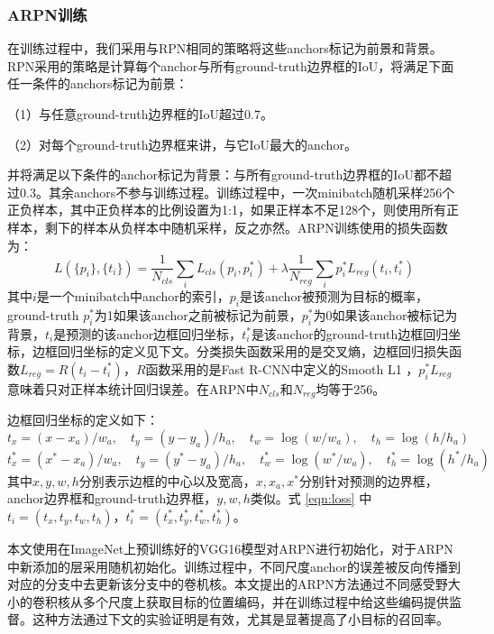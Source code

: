 \subsubsection{ARPN训练}
在训练过程中，我们采用与RPN相同的策略将这些anchors标记为前景和背景。RPN采用的策略是计算每个anchor与所有ground-truth边界框的IoU，将满足下面任一条件的anchors标记为前景：
\begin{namelist}{}
	\item （1）与任意ground-truth边界框的IoU超过0.7。
	\item （2）对每个ground-truth边界框来讲，与它IoU最大的anchor。
\end{namelist}
并将满足以下条件的anchor标记为背景：与所有ground-truth边界框的IoU都不超过0.3。其余anchors不参与训练过程。训练过程中，一次minibatch随机采样256个正负样本，其中正负样本的比例设置为1:1，如果正样本不足128个，则使用所有正样本，剩下的样本从负样本中随机采样，反之亦然。ARPN训练使用的损失函数为：
\begin{equation}\label{eqn:loss}
L(\{p_i\},\{t_i\})=\frac{1}{N_{cls}}\sum_{i}L_{cls}(p_i,p_i^{*})+\lambda\frac{1}{N_{reg}}\sum_{i}p_i^{*}L_{reg}(t_i,t_i^{*})
\end{equation}
其中$i$是一个minibatch中anchor的索引，$p_i$是该anchor被预测为目标的概率，ground-truth $p_i^*$为1如果该anchor之前被标记为前景，$p_i^*$为0如果该anchor被标记为背景，$t_i$是预测的该anchor边框回归坐标，$t_i^*$是该anchor的ground-truth边框回归坐标，边框回归坐标的定义见下文。分类损失函数采用的是交叉熵，边框回归损失函数$L_{reg}=R(t_i-t_i^*)$，$R$函数采用的是Fast R-CNN中定义的Smooth L1 \cite{fast-rcnn}，$p_i^*L_{reg}$意味着只对正样本统计回归误差。在ARPN中$N_{cls}$和$N_{reg}$均等于256。

边框回归坐标的定义如下：
\begin{equation}
t_x=(x-x_a)/w_a,\quad t_y=(y-y_a)/h_a,\quad t_w=\log(w/w_a), \quad t_h=\log(h/h_a)
\end{equation}
\begin{equation}
t_x^*=(x^*-x_a)/w_a,\quad t_y=(y^*-y_a)/h_a,\quad t_w^*=\log(w^*/w_a),\quad t_h^*=\log(h^*/h_a)
\end{equation}
其中$x,y,w,h$分别表示边框的中心以及宽高，$x,x_a,x^*$分别针对预测的边界框，anchor边界框和ground-truth边界框，$y,w,h$类似。式 \ref{eqn:loss} 中$t_i=(t_x, t_y, t_w, t_h)$，$t_i^*=(t_x^*,t_y^*,t_w^*,t_h^*)$。

本文使用在ImageNet上预训练好的VGG16模型对ARPN进行初始化，对于ARPN中新添加的层采用随机初始化。训练过程中，不同尺度anchor的误差被反向传播到对应的分支中去更新该分支中的卷机核。本文提出的ARPN方法通过不同感受野大小的卷积核从多个尺度上获取目标的位置编码，并在训练过程中给这些编码提供监督。这种方法通过下文的实验证明是有效，尤其是显著提高了小目标的召回率。

